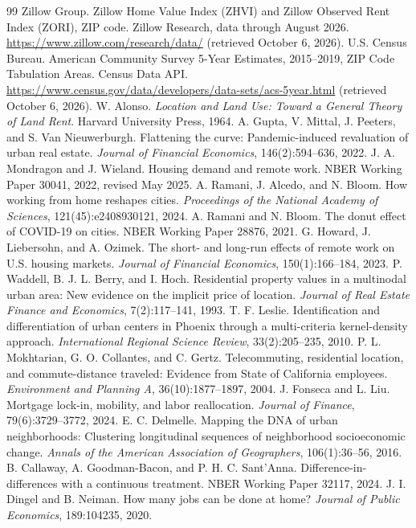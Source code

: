 \documentclass[11pt]{article}
\begin{document}
\begin{thebibliography}{99}\setlength{\itemsep}{0pt}
 Zillow Group. Zillow Home Value Index (ZHVI) and Zillow Observed Rent Index (ZORI), ZIP code. Zillow Research, data through
August 2026. \url{https://www.zillow.com/research/data/} (retrieved October 6, 2026).
 U.S. Census Bureau. American Community Survey 5-Year Estimates, 2015--2019, ZIP Code Tabulation Areas. Census Data API.
\url{https://www.census.gov/data/developers/data-sets/acs-5year.html} (retrieved October 6, 2026).
 W. Alonso. \textit{Location and Land Use: Toward a General Theory of Land Rent}. Harvard University Press, 1964.
 A. Gupta, V. Mittal, J. Peeters, and S. Van Nieuwerburgh. Flattening the curve: Pandemic-induced revaluation of urban real
estate. \textit{Journal of Financial Economics}, 146(2):594--636, 2022.
 J. A. Mondragon and J. Wieland. Housing demand and remote work. NBER Working Paper 30041, 2022, revised May 2025.
 A. Ramani, J. Alcedo, and N. Bloom. How working from home reshapes cities. \textit{Proceedings of the National Academy
of Sciences}, 121(45):e2408930121, 2024.
 A. Ramani and N. Bloom. The donut effect of COVID-19 on cities. NBER Working Paper 28876, 2021.
 G. Howard, J. Liebersohn, and A. Ozimek. The short- and long-run effects of remote work on U.S. housing markets.
\textit{Journal of Financial Economics}, 150(1):166--184, 2023.
 P. Waddell, B. J. L. Berry, and I. Hoch. Residential property values in a multinodal urban area: New evidence on the
implicit price of location. \textit{Journal of Real Estate Finance and Economics}, 7(2):117--141, 1993.
 T. F. Leslie. Identification and differentiation of urban centers in Phoenix through a multi-criteria kernel-density
approach. \textit{International Regional Science Review}, 33(2):205--235, 2010.
 P. L. Mokhtarian, G. O. Collantes, and C. Gertz. Telecommuting, residential location, and commute-distance traveled:
Evidence from State of California employees. \textit{Environment and Planning A}, 36(10):1877--1897, 2004.
 J. Fonseca and L. Liu. Mortgage lock-in, mobility, and labor reallocation. \textit{Journal of Finance}, 79(6):3729--3772,
2024.
 E. C. Delmelle. Mapping the DNA of urban neighborhoods: Clustering longitudinal sequences of neighborhood socioeconomic
change. \textit{Annals of the American Association of Geographers}, 106(1):36--56, 2016.
 B. Callaway, A. Goodman-Bacon, and P. H. C. Sant'Anna. Difference-in-differences with a continuous treatment. NBER
Working Paper 32117, 2024.
 J. I. Dingel and B. Neiman. How many jobs can be done at home? \textit{Journal of Public Economics}, 189:104235, 2020.
\end{thebibliography}
\end{document}
